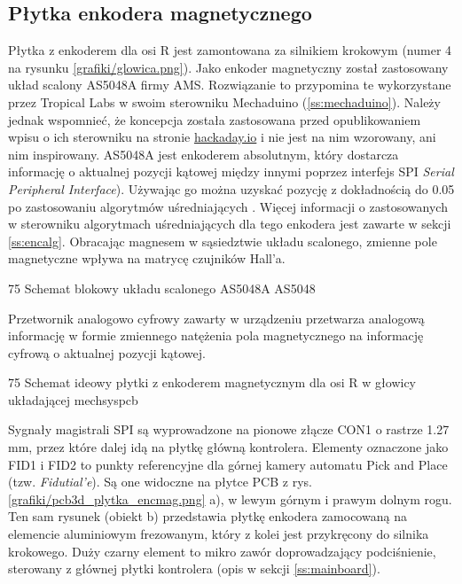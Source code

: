 \subsection{Płytka enkodera magnetycznego}
\label{ss:encmag}

Płytka z enkoderem dla osi R jest zamontowana za silnikiem krokowym (numer 4 na rysunku \ref{grafiki/glowica.png}). Jako enkoder magnetyczny został zastosowany układ scalony AS5048A firmy AMS. Rozwiązanie to przypomina te wykorzystane przez Tropical Labs w swoim sterowniku Mechaduino (\ref{ss:mechaduino}). Należy jednak wspomnieć, że koncepcja została zastosowana przed opublikowaniem wpisu o ich sterowniku na stronie \url{hackaday.io} i nie jest na nim wzorowany, ani nim inspirowany. AS5048A jest enkoderem absolutnym, który dostarcza informację o aktualnej pozycji kątowej między innymi poprzez interfejs SPI {\it Serial Peripheral Interface}). Używając go można uzyskać pozycję z dokładnością do 0.05\degree{} po zastosowaniu algorytmów uśredniających \cite{AS5048}. Więcej informacji o zastosowanych w sterowniku algorytmach uśredniających dla tego enkodera jest zawarte w sekcji \ref{ss:encalg}. Obracając magnesem w sąsiedztwie układu scalonego, zmienne pole magnetyczne wpływa na matrycę czujników Hall'a. 

	{75}
	{Schemat blokowy układu scalonego AS5048A}
	{AS5048}

Przetwornik analogowo cyfrowy zawarty w urządzeniu przetwarza analogową informację w formie zmiennego natężenia pola magnetycznego na informację cyfrową o aktualnej pozycji kątowej.

	{75}
	{Schemat ideowy płytki z enkoderem magnetycznym dla osi R w głowicy układającej}
	{mechsyspcb}
	
Sygnały magistrali SPI są wyprowadzone na pionowe złącze CON1 o rastrze 1.27 mm, przez które dalej idą na płytkę główną kontrolera. Elementy oznaczone jako FID1 i FID2 to punkty referencyjne dla górnej kamery automatu Pick and Place (tzw. {\it Fidutial'e}). Są one widoczne na płytce PCB z rys. \ref{grafiki/pcb3d_plytka_encmag.png} a), w lewym górnym i prawym dolnym rogu. Ten sam rysunek (obiekt b) przedstawia płytkę enkodera zamocowaną na elemencie aluminiowym frezowanym, który z kolei jest przykręcony do silnika krokowego. Duży czarny element to mikro zawór doprowadzający podciśnienie, sterowany z głównej płytki kontrolera (opis w sekcji \ref{ss:mainboard}). \\

